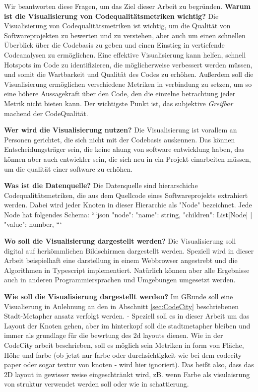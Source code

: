 Wir beantworten diese Fragen, um das Ziel dieser Arbeit zu begründen.
\textbf{Warum ist die Visualisierung von Codequalitätsmetriken wichtig?}
Die Visualisierung von Codequalitätsmetriken ist wichtig, um die Qualität von Softwareprojekten zu bewerten und zu verstehen, aber auch um einen schnellen Überblick über die Codebasis zu geben und einen Einstieg in vertiefende Codeanalysen zu ermöglichen. Eine effektive Visualisierung kann helfen, schnell Hotspots im Code zu identifizieren, die möglicherweise verbessert werden müssen, und somit die Wartbarkeit und Qualität des Codes zu erhöhen. Außerdem soll die Visualisierung ermöglichen verschiedene Metriken in verbindung zu setzen, um so eine höhere Aussagekraft über den Code, den die einzelne betrachtung jeder Metrik nicht bieten kann.
Der wichtigste Punkt ist, das subjektive \textit{Greifbar} machend der CodeQualität.

\textbf{Wer wird die Visualisierung nutzen?}
Die Visualisierung ist vorallem an Personen gerichtet, die sich nicht mit der Codebasis auskennen. Das können Entscheidungsträger sein, die keine ahung von software entwicklung haben, das können aber auch entwickler sein, die sich neu in ein Projekt einarbeiten müssen, um die qualität einer software zu erhöhen.

\textbf{Was ist die Datenquelle?}
Die Datenquelle sind hierarschiche Codequalitätsmetriken, die aus dem Quellcode eines Softwareprojekts extrahiert werden. 
Dabei wird jeder Knoten in dieser Hierarchie als "Node" bezeichnet.
Jede Node hat folgendes Schema:
```json
"node": {
    "name": string,
    "children": List[Node] | "value": number,
}
```


\textbf{Wo soll die Visualisierung dargestellt werden?}
Die Visualisierung soll digital auf herkömmlichen Bildschirmen dargestellt werden. Speziell wird in dieser Arbeit beispielhaft eine darstellung in einem Webbrowser angestrebt und die Algorithmen in Typescript implementiert. Natürlich können aber alle Ergebnisse auch in anderen Programmiersprachen und Umgebungen umgesetzt werden.


\textbf{Wie soll die Visualisierung dargestellt werden?}
Im GRunde soll eine Visualierung in Anlehnung an den in Abschnitt \ref{sec:CodeCity} beschriebenen Stadt-Metapher ansatz verfolgt werden. - Speziell soll es in dieser Arbeit um das Layout der Knoten gehen, aber im hinterkopf soll die stadtmetapher bleiben und immer als grundlage für die bewrtung des 2d layouts dienen. 
Wie in der CodeCity arbeit beschrieben, soll es möglich sein Metriken in form von Fläche, Höhe und farbe (ob jetzt nur farbe oder durchsichtigkeit wie bei dem codecity paper oder sogar textur von knoten - wird hier ignoriert). Das heißt also, dass das 2D layout in gewisser weise eingeschtränkt wird, zB. wenn Farbe als visulaisrung von struktur verwendet werden soll oder wie in \cite{bruls2000squarified} schattierung.

